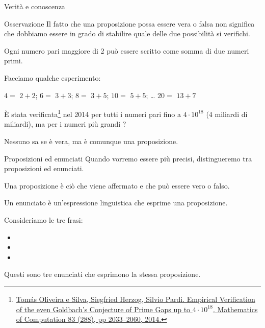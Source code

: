 \documentclass[aspectratio=169,10pt,dvipsnames,handout]{beamer}
\begin{document}
\begin{frame}{Verità e conoscenza}
	\begin{block}{Osservazione}
		Il fatto che una proposizione possa essere vera o falsa non significa che dobbiamo essere in grado di stabilire quale delle due possibilità si verifichi.
	\end{block}

	\begin{example}
		\smallskip
		\begin{proposition}
			Ogni numero pari maggiore di 2 può essere scritto come somma di due numeri primi.
		\end{proposition}

		\pause
		Facciamo qualche esperimento:\\
		\begin{center}
			$4 =$ \pause $2+2$; \pause \qquad $6 =$ \pause $3+3$; \qquad $8 =$ \pause $3+5$; \pause \qquad $10 =$ \pause $5+5$; \pause  \qquad \ldots \qquad
			$20 =$ \pause $13 + 7$ \pause
		\end{center}
		È stata verificata\footnote{\href{https://www.jstor.org/stable/24488269}{Tomás Oliveira e Silva, Siegfried Herzog, Silvio Pardi. Empirical Verification of the even Goldbach’s Conjecture of Prime Gaps up to $4 \cdot 10^{18}$. Mathematics of Computation 83 (288), pp 2033--2060, 2014.}} nel 2014 per tutti i numeri pari fino a $4 \cdot 10^{18}$ (4 miliardi di miliardi), ma per i numeri più grandi ?

		\pause
		\smallskip
		\alert{Nessuno sa se è vera, ma è comunque una proposizione.}
	\end{example}
\end{frame}

\begin{frame}{Proposizioni ed enunciati}
	Quando vorremo essere più precisi, distingueremo tra \alert{proposizioni} ed \alert{enunciati}.

	\begin{definition}[Proposizione]
		Una \alert{proposizione} è ciò che viene affermato e che può essere vero o falso.
	\end{definition}

	\begin{definition}[Enunciato]
		Un \alert{enunciato} è un'espressione linguistica che esprime una proposizione.
	\end{definition}

	\begin{example}
		Consideriamo le tre frasi:
		\begin{itemize}
			\item {}
			\item {}
			\item {}
		\end{itemize}
		Questi sono tre enunciati che esprimono la stessa proposizione.
	\end{example}
\end{frame}
\end{document}
